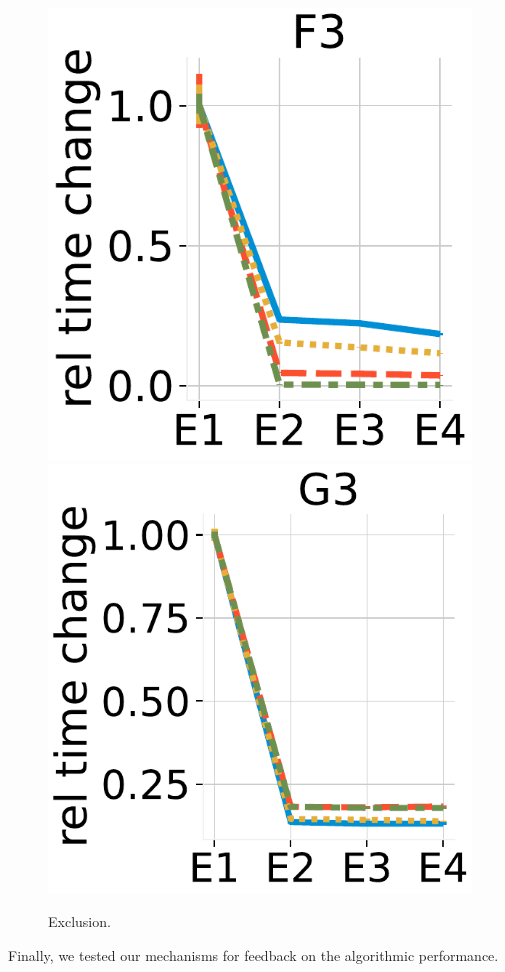 \begin{figure}
	\vspace{-1em}
	\centering
	\includegraphics[scale=0.23]{img/exclude-1.pdf}
	\includegraphics[scale=0.23]{img/exclude-2.pdf}
	\vspace{-1em}
	\caption{Exclusion.}
	\label{fig:exclude}
	
	\vspace{-1em}
\end{figure}
Finally, we tested our mechanisms for feedback on the algorithmic
performance.

